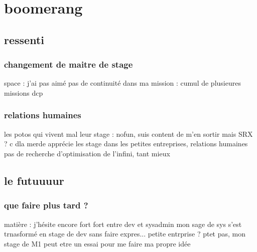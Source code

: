 \section{boomerang}
\subsection{ressenti}
\subsubsection{changement de maitre de stage}
space : j'ai pas aimé
pas de continuité dans ma mission : cumul de plusieures missions dcp
\subsubsection{relations humaines}
les potos qui vivent mal leur stage : nofun, suis content de m'en sortir mais SRX ? c dla merde
apprécie les stage dans les petites entreprises, relations humaines
pas de recherche d'optimisation de l'infini, tant mieux
\subsection{le futuuuur}
\subsubsection{que faire plus tard ?}
matière : j'hésite encore fort fort entre dev et sysadmin
mon sage de sys s'est trnasformé en stage de dev sans faire expres...
petite entrprise ? ptet pas, mon stage de M1 peut etre un essai pour me faire ma propre idée

